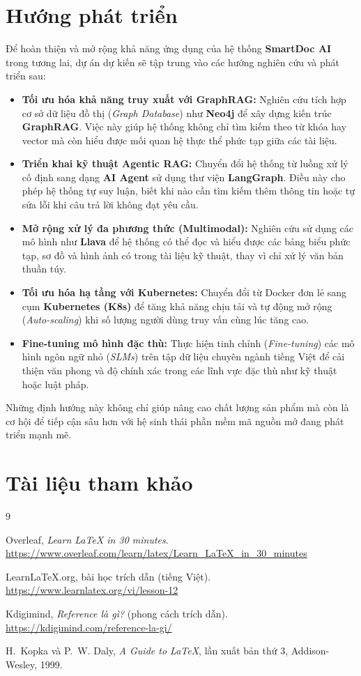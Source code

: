 \documentclass[10pt, conference, a4paper, compsocconf]{IEEEtran}
\begin{document}
\section{Hướng phát triển}

Để hoàn thiện và mở rộng khả năng ứng dụng của hệ thống \textbf{SmartDoc AI} trong tương lai, dự án dự kiến sẽ tập trung vào các hướng nghiên cứu và phát triển sau:

\begin{itemize}
    \item \textbf{Tối ưu hóa khả năng truy xuất với GraphRAG:} Nghiên cứu tích hợp cơ sở dữ liệu đồ thị (\textit{Graph Database}) như \textbf{Neo4j} để xây dựng kiến trúc \textbf{GraphRAG}. Việc này giúp hệ thống không chỉ tìm kiếm theo từ khóa hay vector mà còn hiểu được mối quan hệ thực thể phức tạp giữa các tài liệu.
    \item \textbf{Triển khai kỹ thuật Agentic RAG:} Chuyển đổi hệ thống từ luồng xử lý cố định sang dạng \textbf{AI Agent} sử dụng thư viện \textbf{LangGraph}. Điều này cho phép hệ thống tự suy luận, biết khi nào cần tìm kiếm thêm thông tin hoặc tự sửa lỗi khi câu trả lời không đạt yêu cầu.
    \item \textbf{Mở rộng xử lý đa phương thức (Multimodal):} Nghiên cứu sử dụng các mô hình như \textbf{Llava} để hệ thống có thể đọc và hiểu được các bảng biểu phức tạp, sơ đồ và hình ảnh có trong tài liệu kỹ thuật, thay vì chỉ xử lý văn bản thuần túy.
    \item \textbf{Tối ưu hóa hạ tầng với Kubernetes:} Chuyển đổi từ Docker đơn lẻ sang cụm \textbf{Kubernetes (K8s)} để tăng khả năng chịu tải và tự động mở rộng (\textit{Auto-scaling}) khi số lượng người dùng truy vấn cùng lúc tăng cao.
    \item \textbf{Fine-tuning mô hình đặc thù:} Thực hiện tinh chỉnh (\textit{Fine-tuning}) các mô hình ngôn ngữ nhỏ (\textit{SLMs}) trên tập dữ liệu chuyên ngành tiếng Việt để cải thiện văn phong và độ chính xác trong các lĩnh vực đặc thù như kỹ thuật hoặc luật pháp.
\end{itemize}

Những định hướng này không chỉ giúp nâng cao chất lượng sản phẩm mà còn là cơ hội để tiếp cận sâu hơn với hệ sinh thái phần mềm mã nguồn mở đang phát triển mạnh mẽ.

\section{Tài liệu tham khảo}
\begin{thebibliography}{9}

Overleaf, \emph{Learn LaTeX in 30 minutes}. \url{https://www.overleaf.com/learn/latex/Learn_LaTeX_in_30_minutes}

LearnLaTeX.org, bài học trích dẫn (tiếng Việt). \url{https://www.learnlatex.org/vi/lesson-12}

Kdigimind, \emph{Reference là gì?} (phong cách trích dẫn). \url{https://kdigimind.com/reference-la-gi/}

H.~Kopka và P.~W. Daly, \emph{A Guide to \LaTeX}, lần xuất bản thứ 3, Addison-Wesley, 1999.

\end{thebibliography}
\end{document}
